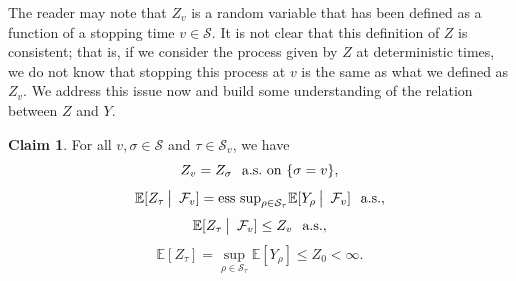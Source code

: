 \documentclass[12pt]{article}
\newcommand{\cF}{\mathcal{F}}
\newcommand{\cS}{\mathcal{S}}
\newcommand{\E}{\mathbb{E}}
\newcommand{\quantifyspace}{\hspace{2px} \big | \hspace{5px}}
\newcommand{\spc}{\hspace{7 px}}
\newcommand{\als}{\text{a.s.}}
\newcommand{\esssup}{\text{ess sup}}
\theoremstyle{definition}
\newtheorem{claim}{Claim}
\begin{document}
The reader may note that $Z_v$ is a random variable that has been defined as a function of a stopping time $v \in \cS$. It is not clear that this definition of $Z$ is consistent; that is, if we consider the process given by $Z$ at deterministic times, we do not know that stopping this process at $v$ is the same as what we defined as $Z_v$. We address this issue now and build some understanding of the relation between $Z$ and $Y$.
\begin{claim} \cite{karatzas1998}
    For all $v, \sigma \in \cS$ and $\tau \in \cS_v$, we have
    \[
        Z_v = Z_\sigma \spc \als \text{ on } \{\sigma = v\},
    \]
    \[
        \E[Z_\tau \quantifyspace \cF_v] = \esssup_{\rho \in \cS_\tau} \E[Y_\rho \quantifyspace \cF_v] \spc \als,
    \]
    \[
        \E[Z_\tau \quantifyspace \cF_v] \leq Z_v \spc \als,
    \]
    \[
        \E[Z_\tau] = \sup_{\rho \in \cS_\tau} \E[Y_\rho] \leq Z_0 < \infty.
    \]

    \proof 
    

\end{claim}
\end{document}
